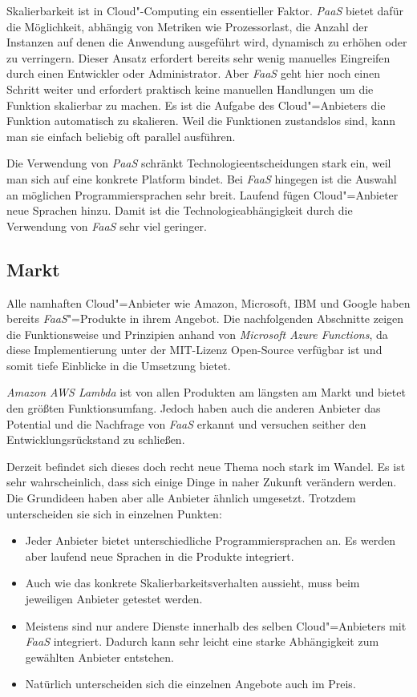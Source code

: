 Skalierbarkeit ist in Cloud"-Computing ein essentieller Faktor. \textit{PaaS} bietet dafür die Möglichkeit, abhängig von Metriken wie Prozessorlast, die Anzahl der Instanzen auf denen die Anwendung ausgeführt wird, dynamisch zu erhöhen oder zu verringern. Dieser Ansatz erfordert bereits sehr wenig manuelles Eingreifen durch einen Entwickler oder Administrator. Aber \textit{FaaS} geht hier noch einen Schritt weiter und erfordert praktisch keine manuellen Handlungen um die Funktion skalierbar zu machen. Es ist die Aufgabe des Cloud"=Anbieters die Funktion automatisch zu skalieren. Weil die Funktionen zustandslos sind, kann man sie einfach beliebig oft parallel ausführen.

Die Verwendung von \textit{PaaS} schränkt Technologieentscheidungen stark ein, weil man sich auf eine konkrete Platform bindet. Bei \textit{FaaS} hingegen ist die Auswahl an möglichen Programmiersprachen sehr breit. Laufend fügen Cloud"=Anbieter neue Sprachen hinzu. Damit ist die Technologieabhängigkeit durch die Verwendung von \textit{FaaS} sehr viel geringer.

\subsection{Markt}

Alle namhaften Cloud"=Anbieter wie Amazon, Microsoft, IBM und Google haben bereits \textit{FaaS}"=Produkte in ihrem Angebot. Die nachfolgenden Abschnitte zeigen die Funktionsweise und Prinzipien anhand von \textit{Microsoft Azure Functions}, da diese Implementierung unter der MIT-Lizenz Open-Source verfügbar ist und somit tiefe Einblicke in die Umsetzung bietet. 

\textit{Amazon AWS Lambda} ist von allen Produkten am längsten am Markt und bietet den größten Funktionsumfang. Jedoch haben auch die anderen Anbieter das Potential und die Nachfrage von \textit{FaaS} erkannt und versuchen seither den Entwicklungsrückstand zu schließen.

Derzeit befindet sich dieses doch recht neue Thema noch stark im Wandel. Es ist sehr wahrscheinlich, dass sich einige Dinge in naher Zukunft verändern werden. Die Grundideen haben aber alle Anbieter ähnlich umgesetzt. Trotzdem unterscheiden sie sich in einzelnen Punkten:

\begin{itemize}
	\item Jeder Anbieter bietet unterschiedliche Programmiersprachen an. Es werden aber laufend neue Sprachen in die Produkte integriert.
	\item Auch wie das konkrete Skalierbarkeitsverhalten aussieht, muss beim jeweiligen Anbieter getestet werden.
	\item Meistens sind nur andere Dienste innerhalb des selben Cloud"=Anbieters mit \textit{FaaS} integriert. Dadurch kann sehr leicht eine starke Abhängigkeit zum gewählten Anbieter entstehen.
	\item Natürlich unterscheiden sich die einzelnen Angebote auch im Preis.
\end{itemize}

